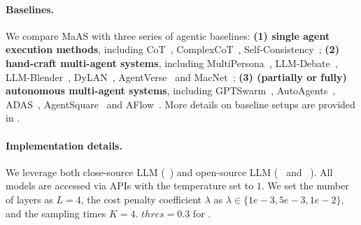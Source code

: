 \documentclass{article}
\theoremstyle{plain}
\theoremstyle{definition}
\theoremstyle{remark}
\newcommand{\ourmethod}{{{MaAS}}\xspace}
\newcommand{\llmname}[1]{{\fontfamily{pcr}\selectfont {#1}}\xspace}
\begin{document}
\paragraph{Baselines.}  We compare \ourmethod with three series of agentic baselines: \textbf{(1) single agent execution methods}, including CoT~\cite{cot}, ComplexCoT~\cite{fu2022complexity}, Self-Consistency~\cite{wang2023selfconsistency}; \textbf{(2) hand-craft multi-agent systems}, including MultiPersona~\citep{multi-persona}, LLM-Debate~\citep{arXiv2023_MultiAgent-Debate}, LLM-Blender~\cite{blender}, DyLAN~\citep{arXiv2023_Dynamic-LLM-Agent}, AgentVerse~\citep{chen2023agentverse} and MacNet~\citep{qian2024scaling}; \textbf{(3) (partially or fully) autonomous multi-agent systems}, including GPTSwarm~\citep{zhuge2024gptswarm}, AutoAgents~\citep{chen2023autoagents}, ADAS~\citep{hu2024adas}, AgentSquare~\citep{shang2024agentsquare} and AFlow~\citep{zhang2024aflow}. More details on baseline setups are provided in .

\vspace{-0.8em}
\paragraph{Implementation details.} We leverage both close-source LLM (\llmname{gpt-4o-mini-0718}~\citep{OpenAI-gpt4o}) and open-source LLM (\llmname{Qwen-2.5-72b-instruct}~\cite{yang2024qwen25} and \llmname{llama-3.1-70b}~\cite{dubey2024llama}). All models are accessed via APIs with the temperature set to $1$. We set the number of layers as $L=4$, the cost penalty coefficient $\lambda$ as $\lambda\in\{1e-3,5e-3,1e-2\}$, and the sampling times $K=4$. $thres=0.3$ for .
\end{document}
